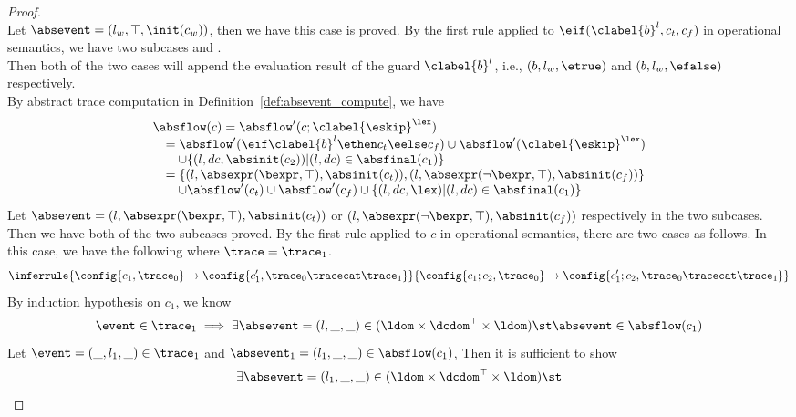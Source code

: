 \begin{proof}
\[    \]
    Let $\absevent = (l_w, \top, \init(c_w))$, then we have this case is proved.
    By the first rule applied to $\eif(\clabel{b}^l, c_t, c_f)$ in operational semantics,
    we have two subcases  and .
    \\
    Then both of the two cases will append the evaluation result of the guard $\clabel{b}^l$, i.e., $(b, l_w, \etrue)$ and $(b, l_w, \efalse)$ respectively.
    \\
    By abstract trace computation in Definition~\ref{def:absevent_compute}, we have
    \[
      \begin{array}{l}
        \absflow(c) = \absflow'(c; \clabel{\eskip}^{\lex}) 
        \\ \quad
        = \absflow'(\eif \clabel{b}^l \ethen c_t \eelse c_f) \cup \absflow'(\clabel{\eskip}^{\lex}) 
        \\ \quad \quad 
        \cup \{ (l, dc, \absinit(c_2)) | (l, dc) \in \absfinal(c_1) \} 
        \\ \quad  
        = \{(l, \absexpr(\bexpr, \top),  \absinit(c_t) ) ,  (l, \absexpr(\neg\bexpr, \top), \absinit(c_f)) \}
        \\ \quad \quad 
        \cup \absflow'(c_t) \cup \absflow'(c_f) 
        \cup \{ (l, dc, \lex) | (l, dc) \in \absfinal(c_1) \} 
     \end{array}
    \]
    Let $\absevent = (l, \absexpr(\bexpr, \top),  \absinit(c_t) ) $ or $ (l, \absexpr(\neg\bexpr, \top), \absinit(c_f)) $
    respectively in the two subcases.
    \\
    Then we have both of the two subcases proved.
    By the first rule applied to $c$ in operational semantics, there are two cases as follows.
    In this case, we have the following where $\trace = \trace_1$.
    \[
      \inferrule
      {
      \config{{c_1, \trace_0}}
      \xrightarrow{}
      \config{{c_1',  \trace_0 \tracecat \trace_1}}
      }
      {
      \config{{c_1; c_2, \trace_0}} 
      \xrightarrow{} 
      \config{{c_1'; c_2, \trace_0 \tracecat \trace_1}}
      }
    \]
    By induction hypothesis on $c_1$, we know 
    \[
      \event \in \trace_1
      \implies
      \exists \absevent = (l, \_, \_) \in (\ldom \times \dcdom^{\top} \times \ldom) \st 
      \absevent \in \absflow(c_1)
    \]
    Let $\event = (\_, l_1, \_) \in \trace_1$ and $\absevent_1 = (l_1, \_, \_) \in \absflow(c_1)$,
    Then it is sufficient to show
    \[
      \exists \absevent = (l_1, \_, \_) \in (\ldom \times \dcdom^{\top} \times \ldom) \st 
\]
\end{proof}
